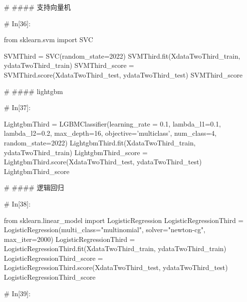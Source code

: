 \documentclass{MathorCupmodeling}
\begin{document}
\begin{python}
# #### 支持向量机

# In[36]:


from sklearn.svm import SVC

SVMThird = SVC(random_state=2022)
SVMThird.fit(XdataTwoThird_train, ydataTwoThird_train)
SVMThird_score = SVMThird.score(XdataTwoThird_test, ydataTwoThird_test)
SVMThird_score


# #### lightgbm

# In[37]:


LightgbmThird = LGBMClassifier(learning_rate = 0.1,
                               lambda_l1=0.1,
                               lambda_l2=0.2,
                               max_depth=16,
                               objective='multiclass',
                               num_class=4,
                               random_state=2022)
LightgbmThird.fit(XdataTwoThird_train, ydataTwoThird_train)
LightgbmThird_score = LightgbmThird.score(XdataTwoThird_test, ydataTwoThird_test)
LightgbmThird_score


# #### 逻辑回归

# In[38]:


from sklearn.linear_model import LogisticRegression
LogisticRegressionThird = LogisticRegression(multi_class="multinomial", solver="newton-cg", max_iter=2000)
LogisticRegressionThird = LogisticRegressionThird.fit(XdataTwoThird_train, ydataTwoThird_train)
LogisticRegressionThird_score = LogisticRegressionThird.score(XdataTwoThird_test, ydataTwoThird_test)
LogisticRegressionThird_score


# In[39]:



\end{python}
\end{document}
